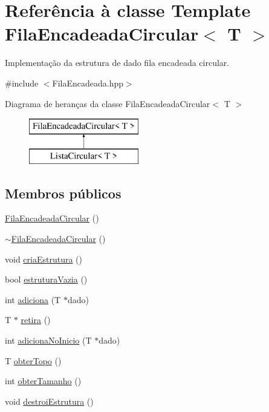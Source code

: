 \hypertarget{class_fila_encadeada_circular}{\section{Referência à classe Template Fila\+Encadeada\+Circular$<$ T $>$}
\label{class_fila_encadeada_circular}
}


Implementação da estrutura de dado fila encadeada circular.  




{\ttfamily \#include $<$Fila\+Encadeada.\+hpp$>$}

Diagrama de heranças da classe Fila\+Encadeada\+Circular$<$ T $>$\begin{figure}[H]
\begin{center}
\leavevmode
\includegraphics[height=2.000000cm]{class_fila_encadeada_circular}
\end{center}
\end{figure}
\subsection*{Membros públicos}
\begin{DoxyCompactItemize}
\item 
\hyperlink{class_fila_encadeada_circular_abc8c9843469e21051da2301482607eee}{Fila\+Encadeada\+Circular} ()
\item 
\hyperlink{class_fila_encadeada_circular_af0fc66d6ac033bbeed34e605f2aac6f7}{$\sim$\+Fila\+Encadeada\+Circular} ()
\item 
void \hyperlink{class_fila_encadeada_circular_a7cf9350910752a11791a8c11d9f9db6b}{cria\+Estrutura} ()
\item 
bool \hyperlink{class_fila_encadeada_circular_ae3672f48a1ba222f8b763ffdf23b7a28}{estrutura\+Vazia} ()
\item 
int \hyperlink{class_fila_encadeada_circular_a5be1b9cba51f2a0e56ff28cac6ccf95c}{adiciona} (T $\ast$dado)
\item 
T $\ast$ \hyperlink{class_fila_encadeada_circular_a6d92caf9954566984c82317355f1cfea}{retira} ()
\item 
int \hyperlink{class_fila_encadeada_circular_ac8cfb69ffbb7928b635602f323f558ce}{adiciona\+No\+Inicio} (T $\ast$dado)
\item 
T \hyperlink{class_fila_encadeada_circular_a453f5226938097c020a82f24522886e1}{obter\+Topo} ()
\item 
int \hyperlink{class_fila_encadeada_circular_ae58955bcc5f4d14d1f55a40cf39471ec}{obter\+Tamanho} ()
\item 
void \hyperlink{class_fila_encadeada_circular_a9639a74b8534ea1a7c635fa23a9cf284}{destroi\+Estrutura} ()
\end{DoxyCompactItemize}
